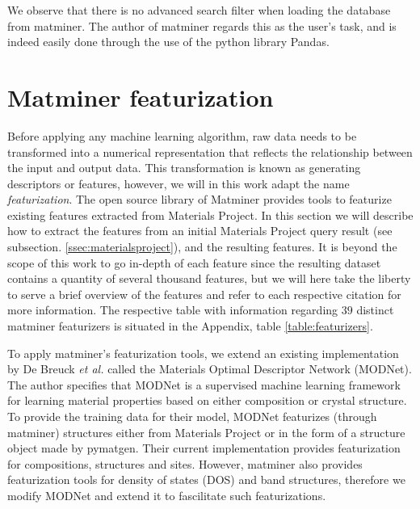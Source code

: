 

We observe that there is no advanced search filter when loading the database from matminer. The author of matminer regards this as the user's task, and is indeed easily done through the use of the python library Pandas.

\section{Matminer featurization}

Before applying any machine learning algorithm, raw data needs to be transformed into a numerical representation that reflects the relationship between the input and output data. This transformation is known as generating descriptors or features, however, we will in this work adapt the name \textit{featurization}. The open source library of Matminer provides tools to featurize existing features extracted from Materials Project. In this section we will describe how to extract the features from an initial Materials Project query result (see subsection. \ref{ssec:materialsproject}), and the resulting features. It is beyond the scope of this work to go in-depth of each feature since the resulting dataset contains a quantity of several thousand features, but we will here take the liberty to serve a brief overview of the features and refer to each respective citation for more information. The respective table with information regarding $39$ distinct matminer featurizers is situated in the Appendix, table \ref{table:featurizers}.



To apply matminer's featurization tools, we extend an existing implementation by De Breuck \textit{et al.} \cite{Breuck2021} called the Materials Optimal Descriptor Network (MODNet). The author specifies that MODNet is a supervised machine learning framework for learning material properties based on either composition or crystal structure. To provide the training data for their model, MODNet featurizes (through matminer) structures either from Materials Project or in the form of a structure object made by pymatgen. Their current implementation provides featurization for compositions, structures and sites. However, matminer also provides featurization tools for density of states (DOS) and band structures, therefore we modify MODNet and extend it to fascilitate such featurizations.

